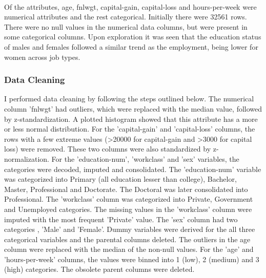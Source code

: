 \documentclass[11pt]{article}
\begin{document}
    \begin{center}
    \end{center}
    { \hspace*{\fill} \\}
    
    Of the attributes, age, fnlwgt, capital-gain, capital-loss and
hours-per-week were numerical attributes and the rest categorical.
Initially there were 32561 rows. There were no null values in the
numerical data columns, but were present in some categorical columns.
Upon exploration it was seen that the education status of males and
females followed a similar trend as the employment, being lower for
women across job types.

    \subsubsection{Data Cleaning}\label{data-cleaning}

    I performed data cleaning by following the steps outlined below. The
numerical column 'fnlwgt' had outliers, which were replaced with the
median value, followed by z-standardization. A plotted histogram showed
that this attribute has a more or less normal distribution. For the
'capital-gain' and 'capital-loss' columns, the rows with a few extreme
values (\textgreater{}20000 for capital-gain and \textgreater{}3000 for
capital loss) were removed. These two columns were also standardized by
z-normalization. For the 'education-num', 'workclass' and 'sex'
variables, the categories were decoded, imputed and consolidated. The
'education-num' variable was categorized into Primary (all education
lesser than college), Bachelor, Master, Professional and Doctorate. The
Doctoral was later consolidated into Professional. The 'workclass'
column was categorized into Private, Government and Unemployed
categories. The missing values in the 'workclass' column were imputed
with the most frequent 'Private' value. The 'sex' column had two
categories , 'Male' and 'Female'. Dummy variables were derived for the
all three categorical variables and the parental columns deleted. The
outliers in the age column were replaced with the median of the non-null
values. For the 'age' and 'hours-per-week' columns, the values were
binned into 1 (low), 2 (medium) and 3 (high) categories. The obsolete
parent columns were deleted.
\end{document}
